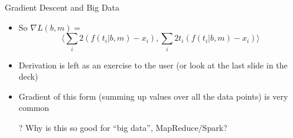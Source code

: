 \documentclass[aspectratio=169]{beamer}
\begin{document}
\begin{frame}{Gradient Descent and Big Data}

\begin{itemize}
\item So $\nabla L(b, m) = $
        $$ \langle \sum_i 2(f(t_i | b, m) - x_i), \sum_i 2t_i(f(t_i | b, m) - x_i) \rangle$$
\item Derivation is left as an exercise to the user (or look at the last slide in the deck)
\item Gradient of this form (summing up values over all the data points) is very common
\item[?] Why is this so good for ``big data'', MapReduce/Spark?
\end{itemize}

\end{frame}
\end{document}

